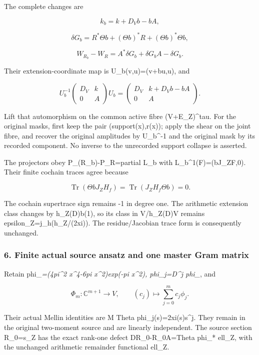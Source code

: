 The complete changes are

\[k_b=k+D_Vb-bA,\]

\[\delta G_b=R^*\Theta b+(\Theta b)^*R+(\Theta b)^*\Theta b,\]

\[\boxed{W_{R_b}-W_R=A^*\delta G_b+\delta G_bA-\delta G_b.}\]

Their extension-coordinate map is U\_b(v,u)=(v+bu,u), and

\[U_b^{-1}\begin{pmatrix}D_V&k\\0&A\end{pmatrix}U_b=\begin{pmatrix}D_V&k+D_Vb-bA\\0&A\end{pmatrix}.\]

Lift that automorphism on the common active fibre (V+E\_Z)\^{}tau. For the original masks, first
keep the pair (support(x),r(x)); apply the shear on the joint fibre, and recover the original
amplitudes by U\_b\^{}-1 and the original mask by its recorded component. No inverse to the
unrecorded support collapse is asserted.

The projectors obey P\_(R\_b)-P\_R=partial L\_b with L\_b\^{}1(F)=(bJ\_ZF,0). Their finite cochain
traces agree because

\[\operatorname{Tr}(\Theta bJ_ZH_f)=\operatorname{Tr}(J_ZH_f\Theta b)=0.\]

The cochain supertrace sign remains -1 in degree one. The arithmetic extension class changes by
h\_Z(D)b(1), so its class in V/h\_Z(D)V remains epsilon\_Z=j\_h(h\_Z/(2xi)). The residue/Jacobian
trace form is consequently unchanged.

\subsubsection{6. Finite actual source ansatz and one master Gram
matrix}\label{pr_11:finite-actual-source-ansatz-and-one-master-gram-matrix}

Retain phi\_\emph{=(4pi\^{}2 x\^{}4-6pi x\^{}2)exp(-pi x\^{}2), phi\_j=D\^{}j phi\_}, and

\[\Phi_m:\mathbb C^{m+1}\to V,\qquad(c_j)\mapsto\sum_{j=0}^m c_j\phi_j.\]

Their actual Mellin identities are M Theta phi\_j(s)=2xi(s)s\^{}j. They remain in the original
two-moment source and are linearly independent. The source section R\_0=s\_Z has the exact rank-one
defect DR\_0-R\_0A=Theta phi\_* ell\_Z, with the unchanged arithmetic remainder functional ell\_Z.

